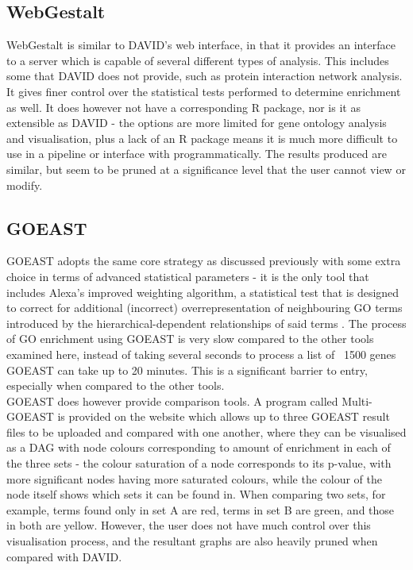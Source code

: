 \documentclass[11pt, oneside]{article}
\begin{document}
\subsection*{WebGestalt}
WebGestalt \cite{WebGestalt05} is similar to DAVID's web interface, in that it provides an interface to a server which is capable of several different types of analysis. This includes some that DAVID does not provide, such as protein interaction network analysis. It gives finer control over the statistical tests performed to determine enrichment as well. It does however not have a corresponding R package, nor is it as extensible as DAVID - the options are more limited for gene ontology analysis and visualisation, plus a lack of an R package means it is much more difficult to use in a pipeline or interface with programmatically. The results produced are similar, but seem to be pruned at a significance level that the user cannot view or modify. %

\subsection*{GOEAST}
GOEAST adopts the same core strategy as discussed previously with some extra choice in terms of advanced statistical parameters - it is the only tool that includes Alexa's improved weighting algorithm, a statistical test that is designed to correct for additional (incorrect) overrepresentation of neighbouring GO terms introduced by the hierarchical-dependent relationships of said terms \cite{GOEast08}. The process of GO enrichment using GOEAST is very slow compared to the other tools examined here, instead of taking several seconds to process a list of ~1500 genes GOEAST can take up to 20 minutes. This is a significant barrier to entry, especially when compared to the other tools.\\
GOEAST does however provide comparison tools. A program called Multi-GOEAST is provided on the website which allows up to three GOEAST result files to be uploaded and compared with one another, where they can be visualised as a DAG with node colours corresponding to amount of enrichment in each of the three sets - the colour saturation of a node corresponds to its p-value, with more significant nodes having more saturated colours, while the colour of the node itself shows which sets it can be found in. When comparing two sets, for example, terms found only in set A are red, terms in set B are green, and those in both are yellow. However, the user does not have much control over this visualisation process, and the resultant graphs are also heavily pruned when compared with DAVID. %
\end{document}
